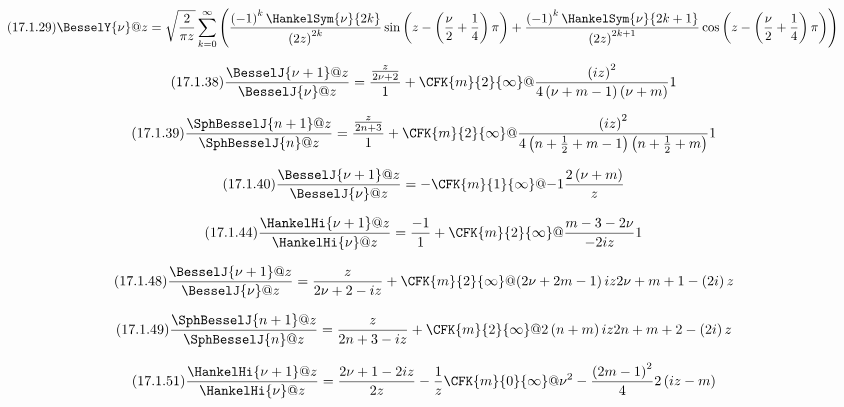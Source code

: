 \documentclass[11pt]{article}
\begin{document}
\begin{equation*}\tag{17.1.29}
  \BesselY{\nu}@{z}
  = \sqrt{\frac{2}{\pi z}} \sum_{k=0}^\infty \left(\frac{\left(-1\right)^{k}\HankelSym{\nu}{2 k}}{\left(2 z\right)^{2 k}}\sin\left(z-\left(\frac{\nu}{2}+\frac{1}{4}\right)\pi\right)+\frac{\left(-1\right)^{k}\HankelSym{\nu}{2 k+1}}{\left(2 z\right)^{2 k+1}}\cos\left(z-\left(\frac{\nu}{2}+\frac{1}{4}\right)\pi\right)\right)
\end{equation*}

\begin{equation*}\tag{17.1.38}
  \frac{\BesselJ{\nu+1}@{z}}{\BesselJ{\nu}@{z}}
  = \frac{\frac{z}{2\nu+2}}{1}+\CFK{m}{2}{\infty}@{\frac{\left(i z\right)^{2}}{4 \left(\nu+m-1\right)\left(\nu+m\right)}}{1}
\end{equation*}

\begin{equation*}\tag{17.1.39}
  \frac{\SphBesselJ{n+1}@{z}}{\SphBesselJ{n}@{z}}
  = \frac{\frac{z}{2 n+3}}{1}+\CFK{m}{2}{\infty}@{\frac{\left(i z\right)^{2}}{4 \left(n+\frac{1}{2}+m-1\right)\left(n+\frac{1}{2}+m\right)}}{1}
\end{equation*}

\begin{equation*}\tag{17.1.40}
  \frac{\BesselJ{\nu+1}@{z}}{\BesselJ{\nu}@{z}}
  = -\CFK{m}{1}{\infty}@{-1}{\frac{2 \left(\nu+m\right)}{z}}
\end{equation*}

\begin{equation*}\tag{17.1.44}
  \frac{\HankelHi{\nu+1}@{z}}{\HankelHi{\nu}@{z}}
  = \frac{-1}{1}+\CFK{m}{2}{\infty}@{\frac{m-3-2\nu}{-2 i z}}{1}
\end{equation*}

\begin{equation*}\tag{17.1.48}
  \frac{\BesselJ{\nu+1}@{z}}{\BesselJ{\nu}@{z}}
  = \frac{z}{2\nu+2-i z}+\CFK{m}{2}{\infty}@{\left(2\nu+2 m-1\right)i z}{2\nu+m+1-\left(2 i\right)z}
\end{equation*}

\begin{equation*}\tag{17.1.49}
  \frac{\SphBesselJ{n+1}@{z}}{\SphBesselJ{n}@{z}}
  = \frac{z}{2 n+3-i z}+\CFK{m}{2}{\infty}@{2 \left(n+m\right)i z}{2 n+m+2-\left(2 i\right)z}
\end{equation*}

\begin{equation*}\tag{17.1.51}
  \frac{\HankelHi{\nu+1}@{z}}{\HankelHi{\nu}@{z}}
  = \frac{2\nu+1-2 i z}{2 z}-\frac{1}{z} \CFK{m}{0}{\infty}@{\nu^{2}-\frac{\left(2 m-1\right)^{2}}{4}}{2 \left(i z-m\right)}
\end{equation*}
\end{document}
